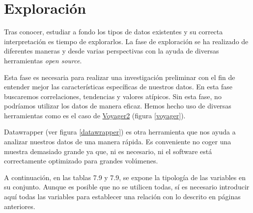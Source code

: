 \section{Exploración}
Tras conocer, estudiar a fondo los tipos de datos existentes y su correcta interpretación es tiempo de explorarlos. La fase de exploración se ha realizado de diferentes maneras y desde varias perspectivas con la ayuda de diversas herramientas \textit{open source}.

Esta fase es necesaria para realizar una investigación preliminar con el fin de entender mejor las características específicas de nuestros datos. En esta fase buscaremos correlaciones, tendencias y valores atípicos. Sin esta fase, no podríamos utilizar los datos de manera eficaz. Hemos hecho uso de diversas herramientas como es el caso de \href{http://vega.github.io/}{Voyager2} (figura \ref{voyager}).

    
Datawrapper (ver figura \ref{datawrapper}) es otra herramienta que nos ayuda a analizar nuestros datos de una manera rápida. Es conveniente no coger una muestra demasiado grande ya que, ni es necesario, ni el software está correctamente optimizado para grandes volúmenes.
    
 
A continuación, en las tablas 7.9 y 7.9, se expone la tipología de las variables en su conjunto. Aunque es posible que no se utilicen todas, sí es necesario introducir aquí todas las variables para establecer una relación con lo descrito en páginas anteriores.

